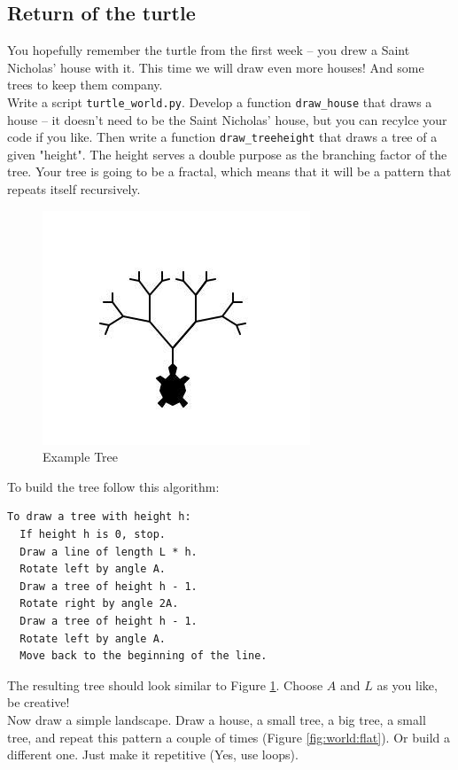 \subsection{Return of the turtle}
\FloatBarrier
You hopefully remember the turtle from the first week -- you drew a Saint Nicholas' house with it.
This time we will draw even more houses! And some trees to keep them company.\\
Write a script \texttt{turtle\_world.py}. Develop a function \texttt{draw\_house} that draws a house --
it doesn't need to be the Saint Nicholas' house, but you can recylce your code if you like.
Then write a function \texttt{draw\_tree{height}} that draws a tree of a given "height".
The height serves a double purpose as the branching factor of the tree. Your tree is going to be a fractal,
which means that it will be a pattern that repeats itself recursively.

\begin{figure}[h]
  \includegraphics[scale=0.8]{recursive_tree}
  \caption{Example Tree}
  \label{fig:tree:1}
\end{figure}


\noindent To build the tree follow this algorithm:\\
\begin{lstlisting}
To draw a tree with height h:
  If height h is 0, stop.
  Draw a line of length L * h.
  Rotate left by angle A.
  Draw a tree of height h - 1.
  Rotate right by angle 2A.
  Draw a tree of height h - 1.
  Rotate left by angle A.
  Move back to the beginning of the line.
\end{lstlisting}

\noindent The resulting tree should look similar to Figure \ref{fig:tree:1}. Choose $A$ and $L$ as you like, be creative!\\
Now draw a simple landscape. Draw a house, a small tree, a big tree, a small tree, and repeat this pattern a couple of times
(Figure \ref{fig:world:flat}). Or build a different one. Just make it repetitive (Yes, use loops).

